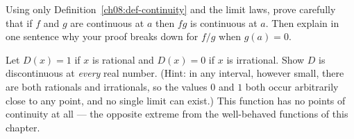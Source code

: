 \begin{exercise}
\label{ch08:exr-prove}
Using only Definition~\ref{ch08:def-continuity} and the limit laws, prove carefully that if
$f$ and $g$ are continuous at $a$ then $fg$ is continuous at $a$. Then explain in one
sentence why your proof breaks down for $f/g$ when $g(a)=0$.
\end{exercise}

\begin{exercise}
\label{ch08:exr-dirichlet}
Let $D(x)=1$ if $x$ is rational and $D(x)=0$ if $x$ is irrational. Show $D$ is discontinuous
at \emph{every} real number. (Hint: in any interval, however small, there are both rationals
and irrationals, so the values $0$ and $1$ both occur arbitrarily close to any point, and no
single limit can exist.) This function has no points of continuity at all --- the opposite
extreme from the well-behaved functions of this chapter.
\end{exercise}
